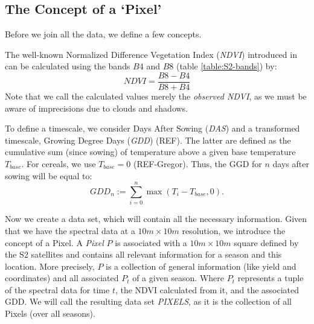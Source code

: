 	\subsection{The Concept of a `Pixel'}{
		\label{sec:gather_data_to_pixel}
		Before we join all the data, we define a few concepts.

		{%
			The well-known Normalized Difference Vegetation Index (\textit{NDVI}) introduced in \cite{rouseMonitoringVernalAdvancement1974} can be calculated using the bands $B4$ and $B8$ (table \ref{table:S2-bands}) by:
			\begin{equation}
				NDVI = \frac{B8 - B4}{B8 + B4}
				\label{eq:ndvi}
			\end{equation}
			Note that we call the calculated values merely the \textit{observed NDVI}, as we must be aware of imprecisions due to clouds and shadows. 
		}

		{%
			To define a timescale, we consider Days After Sowing (\textit{DAS}) and a transformed timescale, Growing Degree Days (\textit{GDD}) (\cite{mcmasterGrowingDegreedaysOne1997}REF). The latter are defined as the cumulative sum (since sowing) of temperature above a given base temperature $T_{base}$. For cereals, we use $T_{base}=0$ (REF-Gregor). Thus, the GGD for $n$ days after sowing will be equal to:
			\begin{equation}
				\label{eq:gdd}
				GDD_n := \sum_{i=0}^n \max(T_i - T_{base}, 0).
			\end{equation}
		} 

		Now we create a data set, which will contain all the necessary information. Given that we have the spectral data at a $10m \times 10m$ resolution, we introduce the concept of a Pixel. A \textit{Pixel} $P$ is associated with a $10m \times 10m$ square defined by the S2 satellites and contains all relevant information for a season and this location. More precisely, $P$ is a collection of general information (like yield and coordinates) and all associated $P_t$ of a given season. Where $P_t$ represents a tuple of the spectral data for time $t$, the NDVI calculated from it, and the associated GDD. 
		We will call the resulting data set \textit{PIXELS}, as it is the collection of all Pixels (over all seasons). 
		

	}

